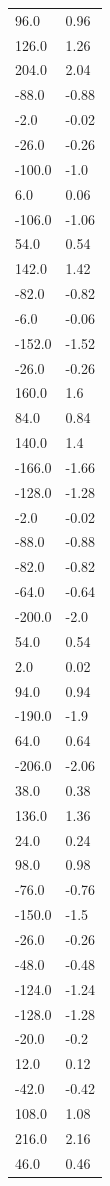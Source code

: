 \begin{longtable}{ll}
96.0 & 0.96 \\
126.0 & 1.26 \\
204.0 & 2.04 \\
-88.0 & -0.88 \\
-2.0 & -0.02 \\
-26.0 & -0.26 \\
-100.0 & -1.0 \\
6.0 & 0.06 \\
-106.0 & -1.06 \\
54.0 & 0.54 \\
142.0 & 1.42 \\
-82.0 & -0.82 \\
-6.0 & -0.06 \\
-152.0 & -1.52 \\
-26.0 & -0.26 \\
160.0 & 1.6 \\
84.0 & 0.84 \\
140.0 & 1.4 \\
-166.0 & -1.66 \\
-128.0 & -1.28 \\
-2.0 & -0.02 \\
-88.0 & -0.88 \\
-82.0 & -0.82 \\
-64.0 & -0.64 \\
-200.0 & -2.0 \\
54.0 & 0.54 \\
2.0 & 0.02 \\
94.0 & 0.94 \\
-190.0 & -1.9 \\
64.0 & 0.64 \\
-206.0 & -2.06 \\
38.0 & 0.38 \\
136.0 & 1.36 \\
24.0 & 0.24 \\
98.0 & 0.98 \\
-76.0 & -0.76 \\
-150.0 & -1.5 \\
-26.0 & -0.26 \\
-48.0 & -0.48 \\
-124.0 & -1.24 \\
-128.0 & -1.28 \\
-20.0 & -0.2 \\
12.0 & 0.12 \\
-42.0 & -0.42 \\
108.0 & 1.08 \\
216.0 & 2.16 \\
46.0 & 0.46 \\

\end{longtable}
